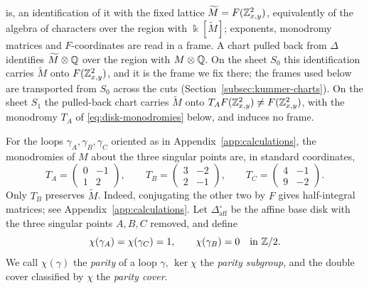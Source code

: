 is, an identification of it with the fixed lattice
$\widetilde M=F(\mathbb Z^2_{x,y})$, equivalently of the algebra of characters
over the region with $\Bbbk[\widetilde M]$; exponents, monodromy matrices
and $F$-coordinates are read in a frame.  A chart pulled back from $\Delta$
identifies $\widetilde M\otimes\mathbb Q$ over the region with $M\otimes\mathbb Q$.  On
the sheet $S_0$ this identification carries $\widetilde M$ onto
$F(\mathbb Z^2_{x,y})$, and it is the frame we fix there; the frames used below
are transported from $S_0$ across the cuts
(Section~\ref{subsec:kummer-charts}).  On the sheet $S_1$ the pulled-back
chart carries $\widetilde M$ onto $T_AF(\mathbb Z^2_{x,y})\neq F(\mathbb Z^2_{x,y})$, with
the monodromy $T_A$ of \eqref{eq:disk-monodromies} below, and induces no
frame.

For the loops $\gamma_A,\gamma_B,\gamma_C$ oriented as in
Appendix~\ref{app:calculations}, the monodromies of $M$ about the three
singular points are, in standard coordinates,
\begin{equation}\label{eq:disk-monodromies}
 T_A=\begin{pmatrix}0&-1\\1&2\end{pmatrix},\qquad
 T_B=\begin{pmatrix}3&-2\\2&-1\end{pmatrix},\qquad
 T_C=\begin{pmatrix}4&-1\\9&-2\end{pmatrix}.
\end{equation}
Only $T_B$ preserves $\widetilde M$.  Indeed, conjugating the other two by
$F$ gives half-integral matrices; see Appendix~\ref{app:calculations}.  Let
$\Delta_{\mathrm{aff}}^\circ$ be the affine base disk with the three
singular points $A,B,C$ removed, and define
\begin{equation}\label{eq:parity-character}
 \chi(\gamma_A)=\chi(\gamma_C)=1,
 \qquad \chi(\gamma_B)=0
 \quad\text{in }\mathbb Z/2.
\end{equation}
We call $\chi(\gamma)$ the \emph{parity} of a loop $\gamma$, $\ker\chi$ the
\emph{parity subgroup}, and the double cover classified by $\chi$ the
\emph{parity cover}.

